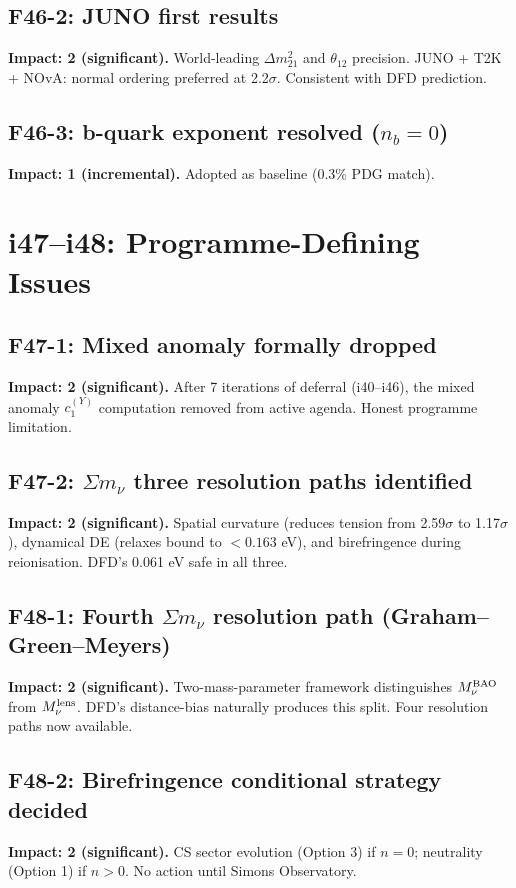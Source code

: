 \documentclass[11pt,a4paper]{article}
\begin{document}
\subsection{F46-2: JUNO first results}
\textbf{Impact: 2 (significant).} World-leading $\Delta m^2_{21}$ and $\theta_{12}$ precision. JUNO + T2K + NOvA: normal ordering preferred at 2.2$\sigma$. Consistent with DFD prediction.

\subsection{F46-3: b-quark exponent resolved ($n_b = 0$)}
\textbf{Impact: 1 (incremental).} Adopted as baseline (0.3\% PDG match).

\section{i47--i48: Programme-Defining Issues}
\label{sec:i47-48}

\subsection{F47-1: Mixed anomaly formally dropped}
\textbf{Impact: 2 (significant).} After 7 iterations of deferral (i40--i46), the mixed anomaly $c_1^{(Y)}$ computation removed from active agenda. Honest programme limitation.

\subsection{F47-2: $\Sigma m_\nu$ three resolution paths identified}
\textbf{Impact: 2 (significant).} Spatial curvature (reduces tension from 2.59$\sigma$ to 1.17$\sigma$), dynamical DE (relaxes bound to $< 0.163$ eV), and birefringence during reionisation. DFD's 0.061 eV safe in all three.

\subsection{F48-1: Fourth $\Sigma m_\nu$ resolution path (Graham--Green--Meyers)}
\textbf{Impact: 2 (significant).} Two-mass-parameter framework distinguishes $M_\nu^{\rm BAO}$ from $M_\nu^{\rm lens}$. DFD's distance-bias naturally produces this split. Four resolution paths now available.

\subsection{F48-2: Birefringence conditional strategy decided}
\textbf{Impact: 2 (significant).} CS sector evolution (Option 3) if $n = 0$; neutrality (Option 1) if $n > 0$. No action until Simons Observatory.
\end{document}
